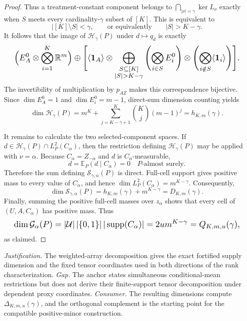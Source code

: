 \documentclass{article}
\begin{document}
\begin{proof}
Thus a treatment-constant component belongs to \(\bigcap_{|\nu|=\gamma}\ker L_\nu\) exactly when \(S\) meets every cardinality-\(\gamma\) subset of \([K]\). This is equivalent to
\[|[K]\setminus S|<\gamma,\qquad\text{or equivalently}\qquad |S|>K-\gamma.\]
It follows that the image of \(\mathcal H_\gamma(P)\) under \(d\mapsto q_d\) is exactly
\[
\makebox[\linewidth][c]{\resizebox{0.98\linewidth}{!}{\par\noindent \makebox[\linewidth][c]{\resizebox{0.98\linewidth}{!}{\(\displaystyle \displaystyle \Bigl(E_A^0\otimes\bigotimes_{i=1}^K\mathbb R^m\Bigr)\oplus\Biggl[\langle\mathbf1_A\rangle\otimes\bigoplus_{\substack{S\subseteq[K]\\|S|>K-\gamma}}\left(\bigotimes_{i\in S}E_i^0\right)\otimes\left(\bigotimes_{i\notin S}\langle\mathbf1_i\rangle\right)\Biggr].\)}}\par\noindent}}
\]
The invertibility of multiplication by \(p_{AZ}\) makes this correspondence bijective. Since \(\dim E_A^0=1\) and \(\dim E_i^0=m-1\), direct-sum dimension counting yields
\[\dim\mathcal H_\gamma(P)=m^K+\sum_{j=K-\gamma+1}^K\binom Kj(m-1)^j=h_{K,m}(\gamma).\]

It remains to calculate the two selected-component spaces. If \(d\in\mathcal H_\gamma(P)\cap L_P^2(C_\alpha)\), then the restriction defining \(\mathcal H_\gamma(P)\) may be applied with \(\nu=\alpha\). Because \(C_\alpha=Z_{-\alpha}\) and \(d\) is \(C_\alpha\)-measurable,
\[d=\mathbb E_P(d\mid C_\alpha)=0\quad P\text{-almost surely}.\]
Therefore the sum defining \(\mathcal S_{\gamma,\alpha}(P)\) is direct. Full-cell support gives positive mass to every value of \(C_\alpha\), and hence \(\dim L_P^2(C_\alpha)=m^{K-\gamma}\). Consequently,
\[\dim\mathcal S_{\gamma,\alpha}(P)=h_{K,m}(\gamma)+m^{K-\gamma}=D_{K,m}(\gamma).\]
Finally, summing the positive full-cell masses over \(z_\alpha\) shows that every cell of \((U,A,C_\alpha)\) has positive mass. Thus
\[
\makebox[\linewidth][c]{\resizebox{0.98\linewidth}{!}{\par\noindent \makebox[\linewidth][c]{\resizebox{0.98\linewidth}{!}{\(\displaystyle \displaystyle \dim\mathcal G_\alpha(P)=|\mathcal U|\,|\{0,1\}|\,|\operatorname{supp}(C_\alpha)|=2u m^{K-\gamma}=Q_{K,m,u}(\gamma),\)}}\par\noindent}}
\]
as claimed.
\end{proof}
\par\smallskip\noindent \textit{Justification.} The weighted-array decomposition gives the exact fortified supply dimension and the fixed tensor coordinates used in both directions of the rank characterization. \textit{Gap.} The anchor states simultaneous conditional-mean restrictions but does not derive their finite-support tensor decomposition under dependent proxy coordinates. \textit{Consumer.} The resulting dimensions compute \(\Delta_{K,m,u}(\gamma)\), and the orthogonal complement is the starting point for the compatible positive-minor construction.
\end{document}
